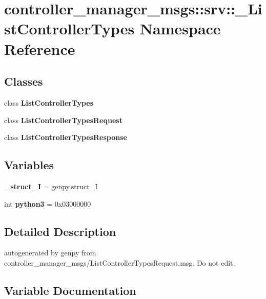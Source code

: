 \section{controller\-\_\-manager\-\_\-msgs\-:\-:srv\-:\-:\-\_\-\-List\-Controller\-Types \-Namespace \-Reference}
\label{namespacecontroller__manager__msgs_1_1srv_1_1__ListControllerTypes}
\subsection*{\-Classes}
\begin{DoxyCompactItemize}
\item 
class {\bf \-List\-Controller\-Types}
\item 
class {\bf \-List\-Controller\-Types\-Request}
\item 
class {\bf \-List\-Controller\-Types\-Response}
\end{DoxyCompactItemize}
\subsection*{\-Variables}
\begin{DoxyCompactItemize}
\item 
{\bf \-\_\-struct\-\_\-\-I} = genpy.\-struct\-\_\-\-I
\item 
int {\bf python3} = 0x03000000
\end{DoxyCompactItemize}


\subsection{\-Detailed \-Description}
\begin{DoxyVerb}autogenerated by genpy from controller_manager_msgs/ListControllerTypesRequest.msg. Do not edit.\end{DoxyVerb}
 

\subsection{\-Variable \-Documentation}
